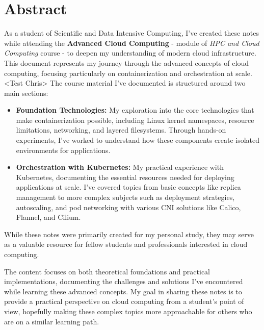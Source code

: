 \chapter*{Abstract}

As a student of Scientific and Data Intensive Computing, I've created these notes while attending the \textbf{Advanced Cloud Computing} - module of \textit{HPC and Cloud Computing} course - to deepen my understanding of modern cloud infrastructure. This document represents my journey through the advanced concepts of cloud computing, focusing particularly on containerization and orchestration at scale.
<Test Chris>
The course material I've documented is structured around two main sections:
\begin{itemize}
    \item \textbf{Foundation Technologies:} My exploration into the core technologies that make containerization possible, including Linux kernel namespaces, resource limitations, networking, and layered filesystems. Through hands-on experiments, I've worked to understand how these components create isolated environments for applications.
    \item \textbf{Orchestration with Kubernetes:} My practical experience with Kubernetes, documenting the essential resources needed for deploying applications at scale. I've covered topics from basic concepts like replica management to more complex subjects such as deployment strategies, autoscaling, and pod networking with various CNI solutions like Calico, Flannel, and Cilium.
\end{itemize}

While these notes were primarily created for my personal study, they may serve as a valuable resource for fellow students and professionals interested in cloud computing.

The content focuses on both theoretical foundations and practical implementations, documenting the challenges and solutions I've encountered while learning these advanced concepts. My goal in sharing these notes is to provide a practical perspective on cloud computing from a student's point of view, hopefully making these complex topics more approachable for others who are on a similar learning path.